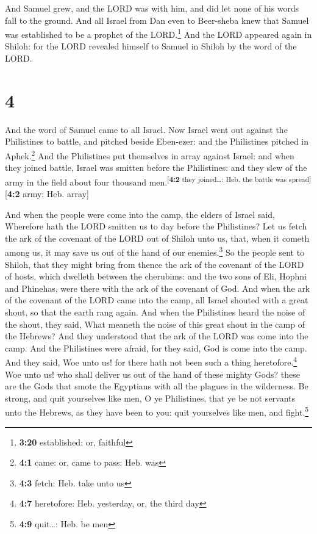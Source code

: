  And Samuel grew, and the LORD was with him, and did let
none of his words fall to the ground.  And all Israel
from Dan even to Beer-sheba knew that Samuel was established to be a
prophet of the LORD.\footnote{\textbf{3:20} established: or, faithful}
 And the LORD appeared again in Shiloh: for the LORD
revealed himself to Samuel in Shiloh by the word of the LORD.

\hypertarget{section-3}{%
\section{4}\label{section-3}}

 And the word of Samuel came to all Israel. Now Israel
went out against the Philistines to battle, and pitched beside
Eben-ezer: and the Philistines pitched in Aphek.\footnote{\textbf{4:1}
  came: or, came to pass: Heb. was}  And the Philistines
put themselves in array against Israel: and when they joined battle,
Israel was smitten before the Philistines: and they slew of the army in
the field about four thousand men.\textsuperscript{{[}\textbf{4:2} they
joined\ldots: Heb. the battle was spread{]}}{[}\textbf{4:2} army: Heb.
array{]}

 And when the people were come into the camp, the elders
of Israel said, Wherefore hath the LORD smitten us to day before the
Philistines? Let us fetch the ark of the covenant of the LORD out of
Shiloh unto us, that, when it cometh among us, it may save us out of the
hand of our enemies.\footnote{\textbf{4:3} fetch: Heb. take unto us}
 So the people sent to Shiloh, that they might bring from
thence the ark of the covenant of the LORD of hosts, which dwelleth
between the cherubims: and the two sons of Eli, Hophni and Phinehas,
were there with the ark of the covenant of God.  And when
the ark of the covenant of the LORD came into the camp, all Israel
shouted with a great shout, so that the earth rang again. 
And when the Philistines heard the noise of the shout, they said, What
meaneth the noise of this great shout in the camp of the Hebrews? And
they understood that the ark of the LORD was come into the camp.
 And the Philistines were afraid, for they said, God is
come into the camp. And they said, Woe unto us! for there hath not been
such a thing heretofore.\footnote{\textbf{4:7} heretofore: Heb.
  yesterday, or, the third day}  Woe unto us! who shall
deliver us out of the hand of these mighty Gods? these are the Gods that
smote the Egyptians with all the plagues in the wilderness.
 Be strong, and quit yourselves like men, O ye
Philistines, that ye be not servants unto the Hebrews, as they have been
to you: quit yourselves like men, and fight.\footnote{\textbf{4:9}
  quit\ldots: Heb. be men}

